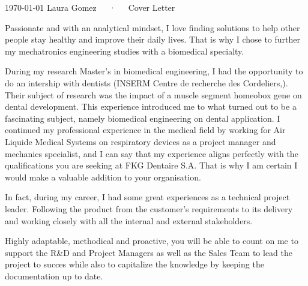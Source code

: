 \documentclass[11pt, a4paper]{awesome-cv}
\begin{document}
\makecvheader[R]

\makecvfooter
  {\today}
  {Laura Gomez~~~·~~~Cover Letter}
  {}

\makelettertitle

\begin{cvletter}


Passionate and with an analytical mindset, I love finding solutions to help other people stay healthy and improve their daily lives.
That is why I chose to further my mechatronics engineering studies with a biomedical specialty. 

During my research Master's in biomedical engineering, I had the opportunity to do an intership with dentists (INSERM Centre de recherche des Cordeliers,). 
Their subject of research was the impact of a muscle segment homeobox gene on dental development. 
This experience introduced me to what turned out to be a fascinating subject, namely biomedical engineering on dental application. 
I continued my professional experience in the medical field by working for Air Liquide Medical Systems on respiratory devices as a project manager and mechanics specialist, 
and I can say that my experience aligns perfectly with the qualifications you are seeking at FKG Dentaire S.A.
That is why I am certain I would make a valuable addition to your organisation.

In fact, during my career, I had some great experiences as a technical project leader. 
Following the product from the customer's requirements to its delivery and working closely with all the internal and external stakeholders.

Highly adaptable, methodical and proactive, you will be able to count on me to support the R\&D and Project Managers as well as the Sales Team
to lead the project to succes while also to capitalize the knowledge by keeping the documentation up to date. 


\end{cvletter}
\end{document}
